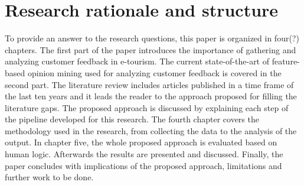 \section{Research rationale and structure}
%
%
To provide an answer to the research questions, this paper is organized in four(?) chapters. The first part of the paper introduces the importance of gathering and analyzing customer feedback in e-tourism. The current state-of-the-art of feature-based opinion mining used for analyzing customer feedback is covered in the second part. The literature review includes articles published in a time frame of the last ten years and it leads the reader to the approach proposed for filling the literature gaps. The proposed approach is discussed by explaining each step of the pipeline developed for this research. The fourth chapter covers the methodology used in the research, from collecting the data to the analysis of the output. In chapter five, the whole proposed approach is evaluated based on human logic. Afterwards the results are presented and discussed. Finally, the paper concludes with implications of the proposed approach, limitations and further work to be done. 

